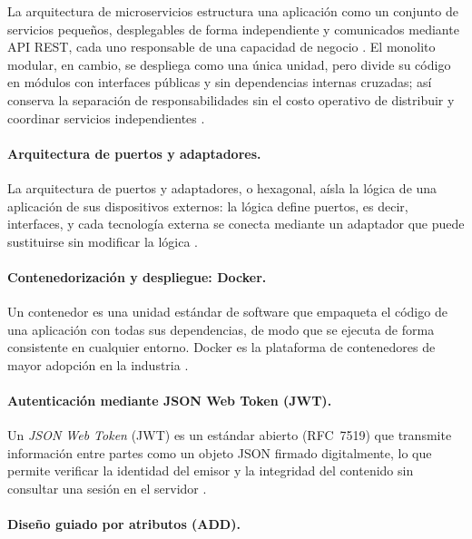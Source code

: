 La arquitectura de microservicios estructura una aplicación como un conjunto de
servicios pequeños, desplegables de forma independiente y comunicados mediante API
REST, cada uno responsable de una capacidad de negocio \cite{ibm2026microservices}.
El monolito modular, en cambio, se despliega como una única unidad, pero divide su
código en módulos con interfaces públicas y sin dependencias internas cruzadas; así
conserva la separación de responsabilidades sin el costo operativo de distribuir y
coordinar servicios independientes \cite{richards2020fundamentals}.

\paragraph{Arquitectura de puertos y adaptadores.}

La arquitectura de puertos y adaptadores, o hexagonal, aísla la lógica de una
aplicación de sus dispositivos externos: la lógica define puertos, es decir,
interfaces, y cada tecnología externa se conecta mediante un adaptador que puede
sustituirse sin modificar la lógica \cite{cockburn2005hexagonal}.

\paragraph{Contenedorización y despliegue: Docker.}

Un contenedor es una unidad estándar de software que empaqueta el código de una
aplicación con todas sus dependencias, de modo que se ejecuta de forma consistente en
cualquier entorno. Docker es la plataforma de contenedores de mayor adopción en la
industria \cite{docker2024containers}.

\paragraph{Autenticación mediante JSON Web Token (JWT).}

Un \textit{JSON Web Token} (JWT) es un estándar abierto (RFC~7519) que transmite
información entre partes como un objeto JSON firmado digitalmente, lo que permite
verificar la identidad del emisor y la integridad del contenido sin consultar una
sesión en el servidor \cite{auth0jwt2024introduction}.

\paragraph{Diseño guiado por atributos (ADD).}

